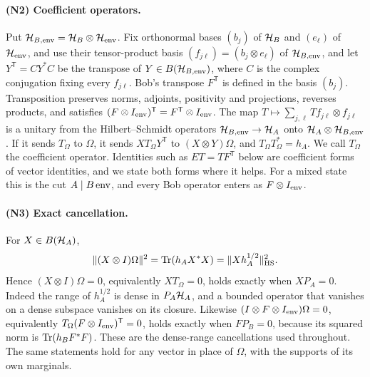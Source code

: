 \paragraph{(N2) Coefficient operators.}
Put $\mathcal H_{B,{\rm env}}=\mathcal H_B\otimes\mathcal H_{\rm env}$. Fix orthonormal bases $(b_j)$ of $\mathcal H_B$ and $(e_\ell)$ of
$\mathcal H_{\rm env}$, and use their tensor-product basis
$(f_{j\ell})=(b_j\otimes e_\ell)$ of $\mathcal H_{B,{\rm env}}$, and let $Y^{\mathsf T}=CY^*C$ be the transpose of $Y\in B(\mathcal H_{B,{\rm env}})$, where $C$ is the complex conjugation fixing every $f_{j\ell}$. Bob's transpose $F^{\mathsf T}$ is defined in the basis $(b_j)$. Transposition preserves norms, adjoints, positivity and projections, reverses products, and satisfies $(F\otimes I_{\rm env})^{\mathsf T}=F^{\mathsf T}\otimes I_{\rm env}$. The map $T\mapsto\sum_{j,\ell}Tf_{j\ell}\otimes f_{j\ell}$ is a unitary from the Hilbert--Schmidt operators $\mathcal H_{B,{\rm env}}\to\mathcal H_A$ onto $\mathcal H_A\otimes\mathcal H_{B,{\rm env}}$. If it sends $T_\Omega$ to $\Omega$, it sends $XT_\Omega Y^{\mathsf T}$ to $(X\otimes Y)\Omega$, and $T_\Omega T_\Omega^*=h_A$. We call $T_\Omega$ the coefficient operator. Identities such as $ET=TF^{\mathsf T}$ below are coefficient forms of vector identities, and we state both forms where it helps. For a mixed state this is the cut $A\mid B\,{\rm env}$, and every Bob operator enters as $F\otimes I_{\rm env}$.

\paragraph{(N3) Exact cancellation.}
For $X\in B(\mathcal H_A)$,
\[
 \|(X\otimes I)\Omega\|^2=\operatorname{Tr}(h_AX^*X)=\|Xh_A^{1/2}\|_{\rm HS}^2 .
\]
Hence $(X\otimes I)\Omega=0$, equivalently $XT_\Omega=0$, holds exactly when $XP_A=0$. Indeed the range of $h_A^{1/2}$ is dense in $P_A\mathcal H_A$, and a bounded operator that vanishes on a dense subspace vanishes on its closure. Likewise $(I\otimes F\otimes I_{\rm env})\Omega=0$, equivalently $T_\Omega(F\otimes I_{\rm env})^{\mathsf T}=0$, holds exactly when $FP_B=0$, because its squared norm is $\operatorname{Tr}(h_BF^*F)$. These are the dense-range cancellations used throughout. The same statements hold for any vector in place of $\Omega$, with the supports of its own marginals.

